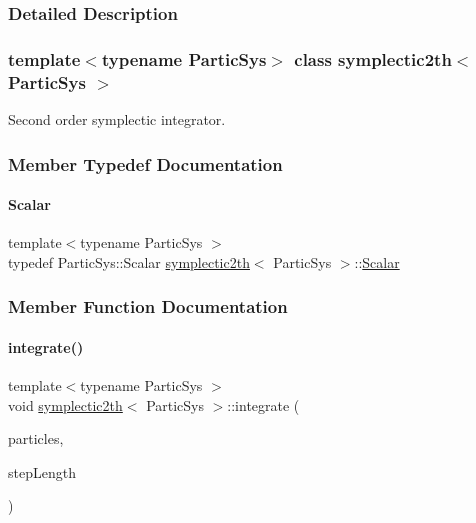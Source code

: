 \subsubsection{Detailed Description}
\subsubsection*{template$<$typename Partic\+Sys$>$\newline
class symplectic2th$<$ Partic\+Sys $>$}

Second order symplectic integrator. 

\subsubsection{Member Typedef Documentation}
\mbox{\label{classsymplectic2th_a08d72f435fb4c69320ead95ba05625a1}} 
\paragraph{\texorpdfstring{Scalar}{Scalar}}
{\footnotesize\ttfamily template$<$typename Partic\+Sys $>$ \\
typedef Partic\+Sys\+::\+Scalar \mbox{\hyperlink{classsymplectic2th}{symplectic2th}}$<$ Partic\+Sys $>$\+::\mbox{\hyperlink{classsymplectic2th_a08d72f435fb4c69320ead95ba05625a1}{Scalar}}\hspace{0.3cm}{\ttfamily [private]}}



\subsubsection{Member Function Documentation}
\mbox{\label{classsymplectic2th_ade78f67685ed50280a210e67397af092}} 
\paragraph{\texorpdfstring{integrate()}{integrate()}}
{\footnotesize\ttfamily template$<$typename Partic\+Sys $>$ \\
void \mbox{\hyperlink{classsymplectic2th}{symplectic2th}}$<$ Partic\+Sys $>$\+::integrate (\begin{DoxyParamCaption}\item[{Partic\+Sys \&}]{particles,  }\item[{\mbox{\hyperlink{classsymplectic2th_a08d72f435fb4c69320ead95ba05625a1}{Scalar}}}]{step\+Length }\end{DoxyParamCaption})}



